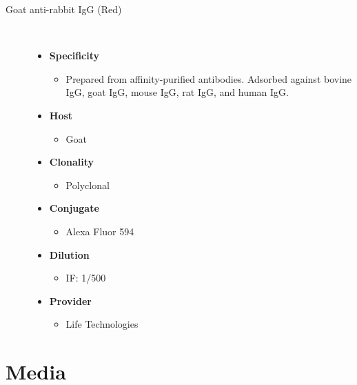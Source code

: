 \begin{description}
\item[Goat anti-rabbit IgG (Red)]~\par
 \begin{itemize}
      \item[] \textbf{Specificity}
      \begin{itemize}
         \item[]Prepared from affinity-purified antibodies. Adsorbed against bovine IgG, goat IgG, mouse IgG, rat IgG, and human IgG.  
      \end{itemize}
      \item[] \textbf{Host}
      \begin{itemize}
      \item[] Goat
      \end{itemize}
            \item[] \textbf{Clonality}
      \begin{itemize}
      \item[] Polyclonal
      \end{itemize}
            \item[] \textbf{Conjugate}
      \begin{itemize}
      \item[]Alexa Fluor\textsuperscript{\textregistered} 594
      \end{itemize}
                  \item[] \textbf{Dilution}
      \begin{itemize}
      \item[]IF: 1/500 
      \end{itemize}       
                  \item[] \textbf{Provider}
      \begin{itemize}
      \item[] Life Technologies
      \end{itemize}     
   \end{itemize} 






\end{description}

\section{Media} 